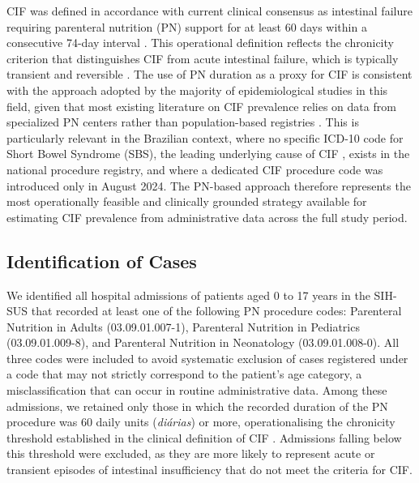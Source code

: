\documentclass[12pt,a4paper]{article}
\theoremstyle{plain}
\theoremstyle{definition}
\theoremstyle{remark}
\begin{document}
CIF was defined in accordance with current clinical consensus as intestinal failure requiring parenteral nutrition (PN) support for at least 60 days within a consecutive 74-day interval \cite{aspen2022pif}. This operational definition reflects the chronicity criterion that distinguishes CIF from acute intestinal failure, which is typically transient and reversible \cite{goulet2006causes, pironi2023espen}. The use of PN duration as a proxy for CIF is consistent with the approach adopted by the majority of epidemiological studies in this field, given that most existing literature on CIF prevalence relies on data from specialized PN centers rather than population-based registries \cite{beath2011trends, antunes2020portuguese, mukhopadhyay2019}. This is particularly relevant in the Brazilian context, where no specific ICD-10 code for Short Bowel Syndrome (SBS), the leading underlying cause of CIF \cite{lezo2022chronic, pironi2023espen}, exists in the national procedure registry, and where a dedicated CIF procedure code was introduced only in August 2024. The PN-based approach therefore represents the most operationally feasible and clinically grounded strategy available for estimating CIF prevalence from administrative data across the full study period.

\subsection*{Identification of Cases}

We identified all hospital admissions of patients aged 0 to 17 years in the SIH-SUS that recorded at least one of the following PN procedure codes: Parenteral Nutrition in Adults (03.09.01.007-1), Parenteral Nutrition in Pediatrics (03.09.01.009-8), and Parenteral Nutrition in Neonatology (03.09.01.008-0). All three codes were included to avoid systematic exclusion of cases registered under a code that may not strictly correspond to the patient's age category, a misclassification that can occur in routine administrative data. Among these admissions, we retained only those in which the recorded duration of the PN procedure was 60 daily units (\textit{di\'{a}rias}) or more, operationalising the chronicity threshold established in the clinical definition of CIF \cite{aspen2022pif}. Admissions falling below this threshold were excluded, as they are more likely to represent acute or transient episodes of intestinal insufficiency that do not meet the criteria for CIF.
\end{document}
